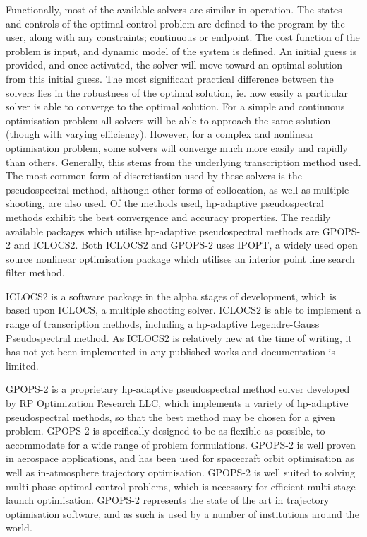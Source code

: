 Functionally, most of the available solvers are similar in operation. The states and controls of the optimal control problem are defined to the program by the user, along with any constraints; continuous or endpoint. The cost function of the problem is input, and dynamic model of the system is defined. An initial guess is provided, and once activated, the solver will move toward an optimal solution from this initial guess. 
The most significant practical difference between the solvers lies in the robustness of the optimal solution, ie. how easily a particular solver is able to converge to the optimal solution. For a simple and continuous optimisation problem all solvers will be able to approach the same solution (though with varying efficiency). However, for a complex and nonlinear optimisation problem, some solvers will converge much more easily and rapidly than others. Generally, this stems from the underlying transcription method used. 
The most common form of discretisation used by these solvers is the pseudospectral method, although other forms of collocation, as well as multiple shooting, are also used. Of the methods used, \textsf{hp}-adaptive pseudospectral methods exhibit the best convergence and accuracy properties\cite{Chai2015}. The readily available packages which utilise \textsf{hp}-adaptive pseudospectral methods are GPOPS-2\cite{Rao2010} and ICLOCS2\cite{iclocs}. Both ICLOCS2 and GPOPS-2 uses IPOPT\cite{Wachter2006}, a widely used open source nonlinear optimisation package which utilises an interior point line search filter method. 

ICLOCS2 is a software package in the alpha stages of development, which is based upon ICLOCS, a multiple shooting solver\cite{iclocs}. ICLOCS2 is able to implement a range of transcription methods, including a \textsf{hp}-adaptive Legendre-Gauss Pseudospectral method\cite{iclocs}. As ICLOCS2 is relatively new at the time of writing, it has not yet been implemented in any published works and documentation is limited. 

GPOPS-2 is a proprietary \textsf{hp}-adaptive pseudospectral method solver developed by RP Optimization Research LLC, which implements a variety of \textsf{hp}-adaptive pseudospectral methods, so that the best method may be chosen for a given problem\cite{Rao2010}. GPOPS-2 is specifically designed to be as flexible as possible, to accommodate for a wide range of problem formulations\cite{Rao2010}. GPOPS-2 is well proven in aerospace applications, and has been used for spacecraft orbit optimisation as well as in-atmosphere trajectory optimisation\cite{Rizvi2015,Lipp2014}. GPOPS-2 is well suited to solving multi-phase optimal control problems, which is necessary for efficient multi-stage launch optimisation\cite{Rao2010}. GPOPS-2 represents the state of the art in trajectory optimisation software, and as such is used by a number of institutions around the world. 



